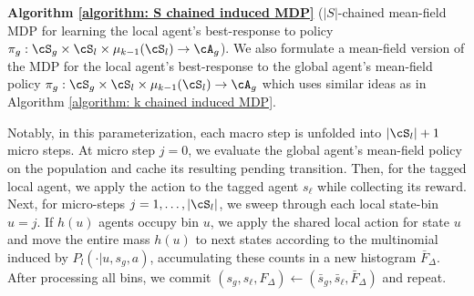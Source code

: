 \documentclass{article}
\theoremstyle{plain}
\theoremstyle{definition}
\begin{document}
\textbf{Algorithm \ref{algorithm: S chained induced MDP}} ($|S|$-chained mean-field MDP for learning the local agent's best-response to policy $\pi_g:\cS_g\times\cS_l\times\mu_{k-1}(\cS_l)\to\cA_g$). We also formulate a mean-field version of the MDP for the local agent's best-response to the global agent's mean-field policy $\pi_g:\cS_g\times\cS_l\times \mu_{k-1}(\cS_l)\to\cA_g$ which uses similar ideas as in Algorithm \ref{algorithm: k chained induced MDP}. 

Notably, in this parameterization, each macro step is unfolded into $|\cS_l|+1$ micro steps. At micro step $j=0$, we evaluate the global agent's mean-field policy on the population and cache its resulting pending  transition. Then, for the tagged local agent, we apply the action to the tagged agent $s_\ell$ while collecting its reward. Next, for micro-steps $j=1,\dots,|\cS_l|$, we sweep through each local state-bin $u=j$. If $h(u)$ agents occupy bin $u$, we apply the shared local action for state $u$ and move the entire mass $h(u)$ to next states according to the multinomial induced by $P_l(\cdot|u,s_g,a)$, accumulating these counts in a new histogram $\bar{F}_\Delta$. After processing all bins, we commit $(s_g, s_\ell, F_\Delta)\gets (\bar{s}_g, \bar{s}_\ell, \bar{F}_\Delta)$ and repeat.
\end{document}
